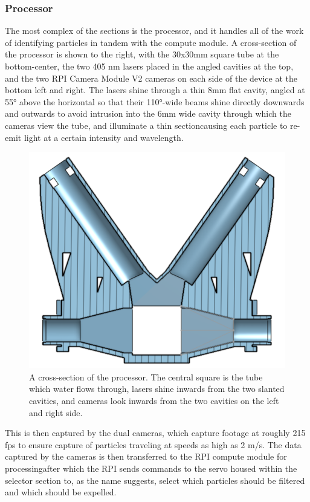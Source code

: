 \documentclass[fleqn,10pt]{SelfArx} %
\begin{document}
	\subsubsection{Processor}
	The most complex of the sections is the processor, and it handles all of the work of identifying particles in tandem with the compute module. A cross-section of the processor is shown to the right, with the 30x30mm square tube at the bottom-center, the two 405 nm lasers placed in the angled cavities at the top, and the two RPI Camera Module V2 cameras on each side of the device at the bottom left and right. The lasers shine through a thin 8mm flat cavity, angled at 55° above the horizontal so that their 110°-wide beams shine directly downwards and outwards to avoid intrusion into the 6mm wide cavity through which the cameras view the tube, and illuminate a thin section\textemdash causing each particle to re-emit light at a certain intensity and wavelength. 
		\begin{figure}[h]
		\centering
		\includegraphics[width=1\linewidth]{Figures/ProcessorCrosssection}
		\caption[Processor Cross-section]{A cross-section of the processor. The central square is the tube which water flows through, lasers shine inwards from the two slanted cavities, and cameras look inwards from the two cavities on the left and right side.}
		\label{fig:ProcessorCrosssec}
	\end{figure}
	This is then captured by the dual cameras, which capture footage at roughly 215 fps to ensure capture of particles traveling at speeds as high as 2 m/s. The data captured by the cameras is then transferred to the RPI compute module for processing\textemdash after which the RPI sends commands to the servo housed within the selector section to, as the name suggests, select which particles should be filtered and which should be expelled. 
\end{document}
